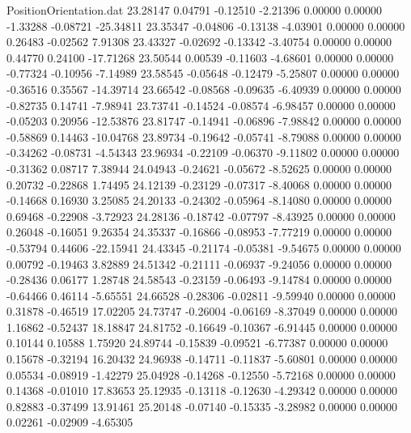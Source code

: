 \begin{filecontents}{PositionOrientation.dat}
  23.28147    0.04791   -0.12510    -2.21396    0.00000    0.00000   -1.33288   -0.08721  -25.34811
  23.35347   -0.04806   -0.13138    -4.03901    0.00000    0.00000    0.26483   -0.02562    7.91308
  23.43327   -0.02692   -0.13342    -3.40754    0.00000    0.00000    0.44770    0.24100  -17.71268
  23.50544    0.00539   -0.11603    -4.68601    0.00000    0.00000   -0.77324   -0.10956   -7.14989
  23.58545   -0.05648   -0.12479    -5.25807    0.00000    0.00000   -0.36516    0.35567  -14.39714
  23.66542   -0.08568   -0.09635    -6.40939    0.00000    0.00000   -0.82735    0.14741   -7.98941
  23.73741   -0.14524   -0.08574    -6.98457    0.00000    0.00000   -0.05203    0.20956  -12.53876
  23.81747   -0.14941   -0.06896    -7.98842    0.00000    0.00000   -0.58869    0.14463  -10.04768
  23.89734   -0.19642   -0.05741    -8.79088    0.00000    0.00000   -0.34262   -0.08731   -4.54343
  23.96934   -0.22109   -0.06370    -9.11802    0.00000    0.00000   -0.31362    0.08717    7.38944
  24.04943   -0.24621   -0.05672    -8.52625    0.00000    0.00000    0.20732   -0.22868    1.74495
  24.12139   -0.23129   -0.07317    -8.40068    0.00000    0.00000   -0.14668    0.16930    3.25085
  24.20133   -0.24302   -0.05964    -8.14080    0.00000    0.00000    0.69468   -0.22908   -3.72923
  24.28136   -0.18742   -0.07797    -8.43925    0.00000    0.00000    0.26048   -0.16051    9.26354
  24.35337   -0.16866   -0.08953    -7.77219    0.00000    0.00000   -0.53794    0.44606  -22.15941
  24.43345   -0.21174   -0.05381    -9.54675    0.00000    0.00000    0.00792   -0.19463    3.82889
  24.51342   -0.21111   -0.06937    -9.24056    0.00000    0.00000   -0.28436    0.06177    1.28748
  24.58543   -0.23159   -0.06493    -9.14784    0.00000    0.00000   -0.64466    0.46114   -5.65551
  24.66528   -0.28306   -0.02811    -9.59940    0.00000    0.00000    0.31878   -0.46519   17.02205
  24.73747   -0.26004   -0.06169    -8.37049    0.00000    0.00000    1.16862   -0.52437   18.18847
  24.81752   -0.16649   -0.10367    -6.91445    0.00000    0.00000    0.10144    0.10588    1.75920
  24.89744   -0.15839   -0.09521    -6.77387    0.00000    0.00000    0.15678   -0.32194   16.20432
  24.96938   -0.14711   -0.11837    -5.60801    0.00000    0.00000    0.05534   -0.08919   -1.42279
  25.04928   -0.14268   -0.12550    -5.72168    0.00000    0.00000    0.14368   -0.01010   17.83653
  25.12935   -0.13118   -0.12630    -4.29342    0.00000    0.00000    0.82883   -0.37499   13.91461
  25.20148   -0.07140   -0.15335    -3.28982    0.00000    0.00000    0.02261   -0.02909   -4.65305

\end{filecontents}
